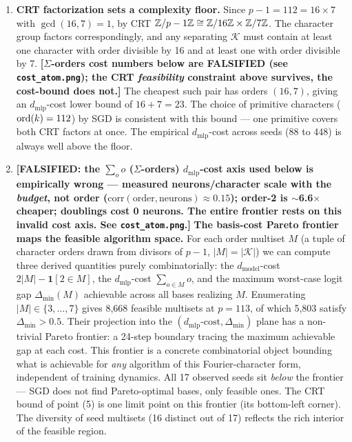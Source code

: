 \begin{enumerate}
\item \textbf{CRT factorization sets a complexity floor.} Since $p-1 =
  112 = 16 \times 7$ with $\gcd(16, 7) = 1$, by CRT $\mathbb{Z}/p-1\mathbb{Z} \cong
  \mathbb{Z}/16\mathbb{Z} \times \mathbb{Z}/7\mathbb{Z}$. The character group factors correspondingly,
  and any separating $\mathcal K$ must contain at least one character
  with order divisible by 16 and at least one with order divisible by 7.
  {\color{red}\textbf{[$\Sigma$-orders cost numbers below are FALSIFIED (see \texttt{cost\_atom.png}); the CRT \emph{feasibility} constraint above survives, the cost-bound does not.]} The cheapest such pair has orders $(16, 7)$, giving an
  $d_{\text{mlp}}$-cost lower bound of $16 + 7 = 23$. The choice of
  primitive characters ($\operatorname{ord}(k) = 112$) by SGD is consistent with this
  bound --- one primitive covers both CRT factors at once. The
  empirical $d_{\text{mlp}}$-cost across seeds (88 to 448) is
  always well above the floor.}

\item {\color{red}\textbf{[FALSIFIED: the $\sum_{o} o$ ($\Sigma$-orders) $d_{\text{mlp}}$-cost axis used below is empirically wrong --- measured neurons/character scale with the \emph{budget}, not order ($\mathrm{corr}(\text{order},\text{neurons})\approx0.15$); order-2 is $\sim$6.6$\times$ cheaper; doublings cost 0 neurons. The entire frontier rests on this invalid cost axis. See \texttt{cost\_atom.png}.]} \textbf{The basis-cost Pareto frontier maps the feasible algorithm
  space.} For each order multiset $M$ (a tuple of character orders
  drawn from divisors of $p-1$, $|M| = |\mathcal K|$) we can compute
  three derived quantities purely combinatorially: the
  $d_{\text{model}}$-cost $2|M| - \mathbf{1}[2 \in M]$, the
  $d_{\text{mlp}}$-cost $\sum_{o \in M} o$, and the maximum
  worst-case logit gap $\Delta_{\min}(M)$ achievable across all bases
  realizing $M$. Enumerating $|M| \in \{3, \ldots, 7\}$ gives 8{,}668
  feasible multisets at $p=113$, of which 5{,}803 satisfy
  $\Delta_{\min} > 0.5$. Their projection into the
  $(d_{\text{mlp}}\text{-cost}, \Delta_{\min})$ plane has a non-trivial
  Pareto frontier: a 24-step boundary tracing the maximum achievable
  gap at each cost. This frontier is a concrete combinatorial object
  bounding what is achievable for \emph{any} algorithm of this
  Fourier-character form, independent of training dynamics. All 17
  observed seeds sit \emph{below} the frontier --- SGD does not find
  Pareto-optimal bases, only feasible ones. The CRT bound of point (5)
  is one limit point on this frontier (its bottom-left corner). The
  diversity of seed multisets (16 distinct out of 17) reflects the rich
  interior of the feasible region.}

\end{enumerate}

